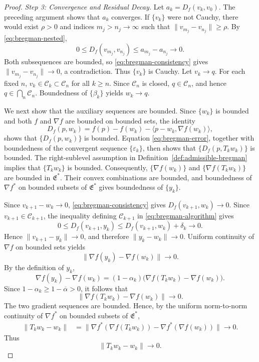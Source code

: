 \documentclass[10pt,a4paper]{amsart}
\newcommand{\C}{\mathscr{C}}
\newcommand{\E}{\mathfrak{E}}
\begin{document}
\begin{proof}
\smallskip
\noindent\emph{Step 3: Convergence and Residual Decay.}
Let $a_k=D_f(v_k,v_0)$. The preceding argument shows that $a_k$ converges. If $\{v_k\}$ were not Cauchy, there would exist $\rho>0$ and indices $m_j>n_j\to\infty$ such that $\|v_{m_j}-v_{n_j}\|\geq\rho$. By \eqref{eq:bregman-nested},
\[
 0\leq D_f(v_{m_j},v_{n_j})\leq a_{m_j}-a_{n_j}\longrightarrow0.
\]
Both subsequences are bounded, so \eqref{eq:bregman-consistency} gives $\|v_{m_j}-v_{n_j}\|\to0$, a contradiction. Thus $\{v_k\}$ is Cauchy. Let $v_k\to q$. For each fixed $n$, $v_k\in\C_k\subset\C_n$ for all $k\geq n$. Since $\C_n$ is closed, $q\in\C_n$, and hence $q\in\bigcap_n\C_n$. Boundedness of $\{\beta_k\}$ yields $w_k\to q$.

We next show that the auxiliary sequences are bounded. Since $\{w_k\}$ is bounded and both $f$ and $\nabla f$ are bounded on bounded sets, the identity
\[
 D_f(p,w_k)=f(p)-f(w_k)-\langle p-w_k,\nabla f(w_k)\rangle,
\]
shows that $\{D_f(p,w_k)\}$ is bounded. Equation \eqref{eq:bregman-error}, together with boundedness of the convergent sequence $\{\varepsilon_k\}$, then shows that $\{D_f(p,T_kw_k)\}$ is bounded. The right-sublevel assumption in Definition~\ref{def:admissible-bregman} implies that $\{T_kw_k\}$ is bounded. Consequently, $\{\nabla f(w_k)\}$ and $\{\nabla f(T_kw_k)\}$ are bounded in $\E^*$. Their convex combinations are bounded, and boundedness of $\nabla f^*$ on bounded subsets of $\E^*$ gives boundedness of $\{y_k\}$.

Since $v_{k+1}-w_k\to0$, \eqref{eq:bregman-consistency} gives $D_f(v_{k+1},w_k)\to0$. Since $v_{k+1}\in\C_{k+1}$, the inequality defining $\C_{k+1}$ in \eqref{eq:bregman-algorithm} gives
\[
 0\leq D_f(v_{k+1},y_k)
 \leq D_f(v_{k+1},w_k)+\delta_k\to0.
\]
Hence $\|v_{k+1}-y_k\|\to0$, and therefore $\|y_k-w_k\|\to0$. Uniform continuity of $\nabla f$ on bounded sets yields
\[
 \|\nabla f(y_k)-\nabla f(w_k)\|\to0.
\]
By the definition of $y_k$,
\[
 \nabla f(y_k)-\nabla f(w_k)
 =(1-\alpha_k)\bigl(\nabla f(T_kw_k)-\nabla f(w_k)\bigr).
\]
Since $1-\alpha_k\geq1-\overline\alpha>0$, it follows that
\[
 \|\nabla f(T_kw_k)-\nabla f(w_k)\|\to0.
\]
The two gradient sequences are bounded. Hence, by the uniform norm-to-norm continuity of $\nabla f^*$ on bounded subsets of $\E^*$,
\begin{align*}
 \|T_kw_k-w_k\|
 &=\bigl\|\nabla f^*(\nabla f(T_kw_k))
 -\nabla f^*(\nabla f(w_k))\bigr\|\longrightarrow0.
\end{align*}
Thus
\begin{equation}\label{eq:bregman-residual}
 \|T_kw_k-w_k\|\to0.
\end{equation}


\end{proof}
\end{document}
